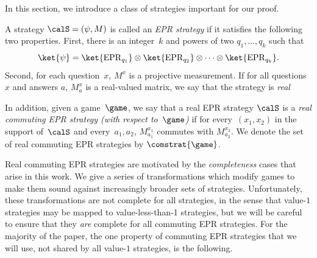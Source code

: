 In this section, we introduce a class of strategies important for our proof.

\begin{definition}
A strategy $\calS = (\psi, M)$ is called an \emph{EPR strategy} if it satisfies the following two properties.
First, there is an integer~$k$ and powers of two $q_1, \ldots, q_k$ such that
\begin{equation*}
\ket{\psi} = \ket{\mathrm{EPR}_{q_1}} \otimes \ket{\mathrm{EPR}_{q_2}} \otimes \cdots \otimes \ket{\mathrm{EPR}_{q_k}}.
\end{equation*}
Second, for each question~$x$, $M^x$ is a projective measurement. If
for all questions $x$ and answers $a$, $M^x_a$ is a real-valued
matrix, we say that the strategy is \emph{real}

In addition, given a game~$\game$, we say that a real EPR strategy $\calS$ is a \emph{real
  commuting EPR strategy (with respect to~$\game$)}
if for every~$(x_1, x_2)$ in the support of~$\calS$ and every~$a_1, a_2$, $M^{x_1}_{a_1}$ commutes with $M^{x_2}_{a_2}$.
We denote the set of real commuting EPR strategies by $\comstrat{\game}$.
\end{definition}

Real commuting EPR strategies are motivated by the \emph{completeness} cases that arise in this work.
We give a series of transformations which modify games to make them sound against increasingly broader sets of strategies.
Unfortunately, these transformations are not complete for all strategies, in the sense that value-$1$ strategies may be mapped to value-less-than-1 strategies,
but we will be careful to ensure that they \emph{are} complete for all commuting EPR strategies.
For the majority of the paper, the one property of commuting EPR strategies that we will use, not shared by all value-$1$ strategies, is the following.

